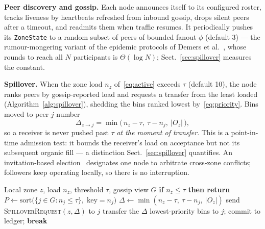 \documentclass{llncs}
\begin{document}
\textbf{Peer discovery and gossip.} Each node announces itself to its
configured roster, tracks liveness by heartbeats refreshed from inbound gossip,
drops silent peers after a timeout, and readmits them when traffic resumes. It
periodically pushes its \texttt{ZoneState} to a random subset of peers of
bounded fanout $\phi$ (default 3) --- the rumour-mongering variant of the
epidemic protocols of Demers et al.~\cite{demers}, whose rounds to reach all
$N$ participants is $\Theta(\log N)$; Sect.~\ref{sec:spillover} measures the
constant.

\textbf{Spillover.} When the zone load $n_z$ of~\eqref{eq:active} exceeds
$\tau$ (default 10), the node ranks peers by gossip-reported load and requests
a transfer from the least loaded (Algorithm~\ref{alg:spillover}), shedding the
bins ranked lowest by~\eqref{eq:priority}. Bins moved to peer $j$ number
\begin{equation}
  \Delta_{z\rightarrow j}
  = \min\bigl(\,n_z-\tau,\ \tau-n_j,\ |O_z|\,\bigr),
  \label{eq:spill}
\end{equation}
so a receiver is never pushed past $\tau$ \emph{at the moment of transfer}.
This is a point-in-time admission test: it bounds the receiver's load on
acceptance but not its subsequent organic fill --- a distinction
Sect.~\ref{sec:spillover} quantifies. An invitation-based
election~\cite{garciamolina} designates one node to arbitrate cross-zone
conflicts; followers keep operating locally, so there is no interruption.

\begin{algorithm}[htbp]
\caption{Spillover Load Balancing}
\label{alg:spillover}
\begin{algorithmic}[1]
\Require Local zone $z$, load $n_z$, threshold $\tau$, gossip view $G$
\State \textbf{if} $n_z \le \tau$ \textbf{then return}
\State $P \leftarrow \text{sort}\bigl(\{j \in G : n_j \le \tau\},\;
       \text{key}=n_j\bigr)$
  \State $\Delta \leftarrow \min(n_z-\tau,\ \tau-n_j,\ |O_z|)$
  \State send \textsc{SpilloverRequest}$(z,\Delta)$ to $j$
    \State transfer the $\Delta$ lowest-priority bins to $j$;
           commit to ledger; \textbf{break}
  \EndIf
\EndFor
\end{algorithmic}
\end{algorithm}
\end{document}

